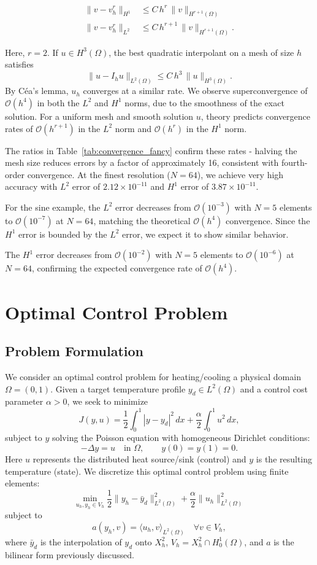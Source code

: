 \documentclass[a4paper,10pt]{article}
\begin{document}
\begin{align*}
	\|v - v_h^r\|_{H^1} & \le C\,h^{r}\,\|v\|_{H^{r+1}(\Omega)}    \\
	\|v - v_h^r\|_{L^2} & \le C\,h^{r+1}\,\|v\|_{H^{r+1}(\Omega)}.
\end{align*}

Here, $r=2$. If $u \in H^3(\Omega)$, the best quadratic interpolant on a mesh
of size $h$ satisfies
\[
	\|u - I_h u\|_{L^2(\Omega)} \le C\,h^{3}\,\|u\|_{H^3(\Omega)}.
\]
By Céa's lemma, $u_h$ converges at a similar rate\cite{Curry2018}.
We observe superconvergence of $\mathcal{O}(h^4)$ in both the $L^2$ and $H^1$ norms, due to the smoothness of the exact solution.
For a uniform mesh and smooth solution $u$, theory predicts convergence rates of $\mathcal{O}(h^{r+1})$ in the $L^2$ norm and $\mathcal{O}(h^r)$ in the $H^1$ norm.

The ratios in Table~\ref{tab:convergence_fancy} confirm these rates - halving the mesh size reduces errors by a factor of approximately 16, consistent with fourth-order convergence. At the finest resolution ($N=64$), we achieve very high accuracy with $L^2$ error of $2.12 \times 10^{-11}$ and $H^1$ error of $3.87 \times 10^{-11}$.

For the sine example, the $L^2$ error decreases from $\mathcal{O}(10^{-3})$ with $N=5$ elements to $\mathcal{O}(10^{-7})$ at $N=64$, matching the theoretical $\mathcal{O}(h^4)$ convergence.
Since the $H^1$ error is bounded by the $L^2$ error, we expect it to show similar behavior.

The $H^1$ error decreases from $\mathcal{O}(10^{-2})$ with $N=5$ elements to $\mathcal{O}(10^{-6})$ at $N=64$, confirming the expected convergence rate of $\mathcal{O}(h^4)$.

\section{Optimal Control Problem}
\label{sec:optimal_control}
\subsection{Problem Formulation}
We consider an optimal control problem for heating/cooling a physical domain \(\Omega=(0,1)\).
Given a target temperature profile \(y_d \in L^2(\Omega)\) and a control cost parameter \(\alpha > 0\), we seek to minimize
\[
	J(y,u) = \frac{1}{2}\int_0^1 |y-y_d|^2\,dx + \frac{\alpha}{2}\int_0^1 u^2\,dx,
\]
subject to \(y\) solving the Poisson equation with homogeneous Dirichlet conditions:
\[
	-\Delta y = u \quad\text{in }\Omega, \qquad y(0) = y(1) = 0.
\]
Here \(u\) represents the distributed heat source/sink (control) and \(y\) is the resulting temperature (state).
We discretize this optimal control problem using finite elements:
\[
	\min_{u_h,y_h\in V_h} \frac{1}{2}\|y_h - \bar{y}_d\|^2_{L^2(\Omega)} + \frac{\alpha}{2}\|u_h\|^2_{L^2(\Omega)}
\]
subject to
\[
	a(y_h,v) = \langle u_h,v \rangle_{L^2(\Omega)} \quad \forall v\in V_h,
\]
where \(\bar{y}_d\) is the interpolation of \(y_d\) onto \(X^2_h\), \(V_h = X^2_h \cap H^1_0(\Omega)\), and \(a\) is the bilinear form previously discussed.
\end{document}
